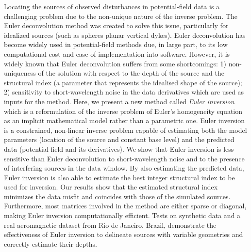 Locating the sources of observed disturbances in potential-field data is a challenging problem due to the non-unique nature of the inverse problem.
The Euler deconvolution method was created to solve this issue, particularly for idealized sources (such as spheres \DIFdelbegin \DIFdel{, }\DIFdelend \DIFaddbegin {}\DIFaddend planar vertical dykes).
Euler deconvolution has become widely used in potential-field methods due, in large part, to its low computational cost and ease of implementation into software.
However, it is widely known that Euler deconvolution suffers from some shortcomings: 1) non-uniqueness of the solution with respect to the depth of the source and the structural index (a parameter that represents the idealised shape of the source); 2) sensitivity to short-wavelength noise in the data derivatives which are used as inputs for the method.
Here, we present a new method called \textit{Euler inversion} which is a reformulation of the inverse problem of Euler's homogeneity equation as an implicit mathematical model rather than a parametric one.
Euler inversion is a constrained, non-linear inverse problem capable of estimating both the model parameters (location of the source and constant base level) and the predicted data (potential field and its derivatives).
We show that Euler inversion is less sensitive than Euler deconvolution to short-wavelength noise and to the presence of interfering sources in the data window.
By also estimating the predicted data, Euler inversion is also able to estimate the best integer structural index
to be used for inversion.
Our results show that the estimated structural index minimizes the data misfit and coincides with those of the simulated sources.
Furthermore, most matrices involved in the method are either sparse or diagonal, making Euler inversion computationally efficient.
Tests on synthetic data and a real aeromagnetic dataset from Rio de Janeiro, Brazil, demonstrate the effectiveness of Euler inversion to delineate sources with variable geometries and correctly estimate their depths.
